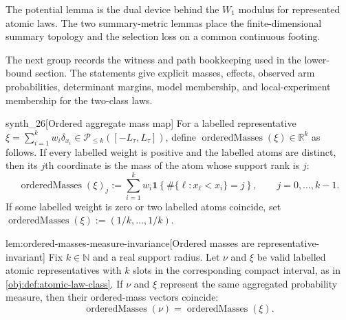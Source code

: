 The potential lemma is the dual device behind the \(W_1\) modulus for represented atomic laws. The two summary-metric lemmas place the finite-dimensional summary topology and the selection loss on a common continuous footing.

The next group records the witness and path bookkeeping used in the lower-bound section. The statements give explicit masses, effects, observed arm probabilities, determinant margins, model membership, and local-experiment membership for the two-class laws.

\begin{definitionv}{synth_26}[Ordered aggregate mass map]
For a labelled representative \(\xi=\sum_{i=1}^k w_i\delta_{x_i}\in\mathcal P_{\le k}([-L_\tau,L_\tau])\), define \(\operatorname{orderedMasses}(\xi)\in\mathbb R^k\) as follows. If every labelled weight is positive and the labelled atoms are distinct, then its \(j\)th coordinate is the mass of the atom whose support rank is \(j\):
\[
\operatorname{orderedMasses}(\xi)_j
:=\sum_{i=1}^k w_i\mathbf 1\!\left\{\#\{\ell:x_\ell<x_i\}=j\right\},
\qquad j=0,\ldots,k-1.
\]
If some labelled weight is zero or two labelled atoms coincide, set \(\operatorname{orderedMasses}(\xi):=(1/k,\ldots,1/k)\).
\end{definitionv}

\begin{lemmav}{lem:ordered-masses-measure-invariance}[Ordered masses are representative-invariant]
Fix \(k\in\mathbb N\) and a real support radius.  Let \(\nu\) and \(\xi\) be valid labelled atomic representatives with \(k\) slots in the corresponding compact interval, as in \cref{obj:def:atomic-law-class}.  If \(\nu\) and \(\xi\) represent the same aggregated probability measure, then their ordered-mass vectors coincide:
\[
\operatorname{orderedMasses}(\nu)=\operatorname{orderedMasses}(\xi).
\]
\end{lemmav}

